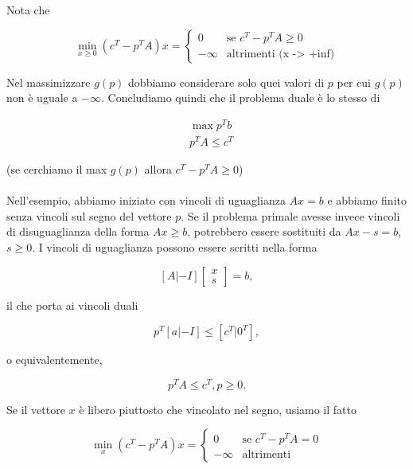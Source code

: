 \documentclass[a4paper, 11pt]{article}
\begin{document}
        Nota che

        \[
        \min_{x \geq 0} (c^T - p^T A)x = \begin{cases}
        0 & \text{se } c^T - p^T A \geq 0 \\
        -\infty & \text{altrimenti (x -> +inf)}
        \end{cases}
        \]

        Nel massimizzare $g(p)$ dobbiamo considerare solo quei valori di $p$ per cui $g(p)$ non è uguale a $-\infty$. Concludiamo quindi che il problema duale è lo stesso di

        \[
        \begin{aligned}
            & \max p^T b \\
            & p^T A \leq c^T
        \end{aligned}
        \]

        (se cerchiamo il max $g(p)$ allora $c^T - p^T A \geq 0$)

        \paragraph{}
        Nell'esempio, abbiamo iniziato con vincoli di uguaglianza $Ax = b$ e abbiamo finito senza vincoli sul segno del vettore $p$. Se il problema primale avesse invece vincoli di disuguaglianza della forma $Ax \geq b$, potrebbero essere sostituiti da $Ax - s = b$, $s \geq 0$. I vincoli di uguaglianza possono essere scritti nella forma

        \[
            [A | -I] \begin{bmatrix} x \\ s \end{bmatrix} = b,
        \]

        il che porta ai vincoli duali

        \[
            p^T [a | -I] \leq [c^T | 0^T],
        \]

        o equivalentemente,

        \[
            p^T A \leq c^T, p \geq 0.
        \]

        Se il vettore $x$ è libero piuttosto che vincolato nel segno, usiamo il fatto

        \[
        \min_{x} (c^T - p^T A)x = 
        \begin{cases}
            0 & \text{se } c^T - p^T A = 0 \\
            -\infty & \text{altrimenti}
        \end{cases}
        \]
\end{document}
